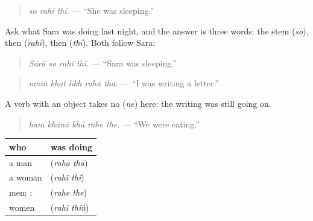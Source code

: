 \begin{grammarlens}[title={Grammar Lens: was doing}]
\begin{quote}
\textbf{  }
\end{quote}

\begin{quote}
\emph{so rahī thī.} — \textquotedblleft{}She was sleeping.\textquotedblright{}
\end{quote}

Ask what Sara was doing last night, and the answer is three words: the stem \textbf{} (\emph{so}), then \textbf{} (\emph{rahī}), then \textbf{} (\emph{thī}). Both follow Sara:

\begin{quote}
\textbf{   }
\end{quote}

\begin{quote}
\emph{Sārā so rahī thī.} — \textquotedblleft{}Sara was sleeping.\textquotedblright{}
\end{quote}

\begin{quote}
\textbf{    }
\end{quote}

\begin{quote}
\emph{maiṅ khat likh rahā thā.} — \textquotedblleft{}I was writing a letter.\textquotedblright{}
\end{quote}

A verb with an object takes no \textbf{} (\emph{ne}) here: the writing was still going on.

\begin{quote}
\textbf{    }
\end{quote}

\begin{quote}
\emph{ham khānā khā rahe the.} — \textquotedblleft{}We were eating.\textquotedblright{}
\end{quote}

\noindent
\begin{tabularx}{\linewidth}{@{}>{\raggedright\arraybackslash}X>{\raggedright\arraybackslash}X@{}}
\toprule
\textbf{who} & \textbf{was doing} \\
\midrule
a man & \textbf{\ur{رہا} \ur{تھا}} (\emph{rahā thā}) \\
a woman & \textbf{\ur{رہی} \ur{تھی}} (\emph{rahī thī}) \\
men; \textbf{\ur{ہم}}; \textbf{\ur{آپ}} & \textbf{\ur{رہے} \ur{تھے}} (\emph{rahe the}) \\
women & \textbf{\ur{رہی} \ur{تھیں}} (\emph{rahī thīṅ}) \\
\bottomrule
\end{tabularx}
\end{grammarlens}

